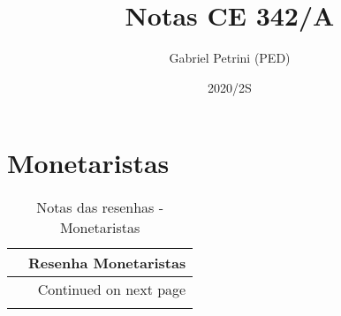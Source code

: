 \documentclass[11pt]{article}
\author{Gabriel Petrini (PED)}
\date{2020/2S}
\title{Notas CE 342/A}
\begin{document}
\maketitle

\section{Monetaristas}
\label{sec:orgdb8e0cd}

\begin{center}
\begin{longtable}{lr}
\caption{Notas das resenhas - Monetaristas}\\
\toprule
{} &  Resenha Monetaristas \\
\midrule
\endhead
\midrule
\multicolumn{2}{r}{{Continued on next page}} \\
\midrule
\endfoot


\end{longtable}
\end{center}
\end{document}
